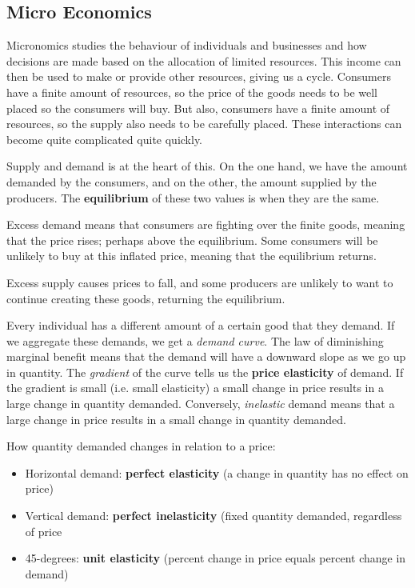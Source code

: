 \documentclass[11pt,a4paper,titlepage,dvipsnames,cmyk]{scrartcl}
\begin{document}
\subsection{Micro Economics}
Micronomics studies the behaviour of individuals and businesses and how decisions are made based on the allocation of limited resources. This income can then be used to make or provide other resources, giving us a cycle. Consumers have a finite amount of resources, so the price of the goods needs to be well placed so the consumers will buy. But also, consumers have a finite amount of resources, so the supply also needs to be carefully placed. These interactions can become quite complicated quite quickly.

Supply and demand is at the heart of this. On the one hand, we have the amount demanded by the consumers, and on the other, the amount supplied by the producers. The \textbf{equilibrium} of these two values is when they are the same.

Excess demand means that consumers are fighting over the finite goods, meaning that the price rises; perhaps above the equilibrium. Some consumers will be unlikely to buy at this inflated price, meaning that the equilibrium returns.

Excess supply causes prices to fall, and some producers are unlikely to want to continue creating these goods, returning the equilibrium.

Every individual has a different amount of a certain good that they demand. If we aggregate these demands, we get a \textit{demand curve}. The law of diminishing marginal benefit means that the demand will have a downward slope as we go up in quantity. The \textit{gradient} of the curve tells us the \textbf{price elasticity} of demand. If the gradient is small (i.e. small elasticity) a small change in price results in a large change in quantity demanded. Conversely, \textit{inelastic} demand means that a large change in price results in a small change in quantity demanded.

How quantity demanded changes in relation to a price:
\begin{itemize}
    \item Horizontal demand: \textbf{perfect elasticity} (a change in quantity has no effect on price)
    \item Vertical demand: \textbf{perfect inelasticity} (fixed quantity demanded, regardless of price
    \item 45-degrees: \textbf{unit elasticity} (percent change in price equals percent change in demand)
\end{itemize}
\end{document}
